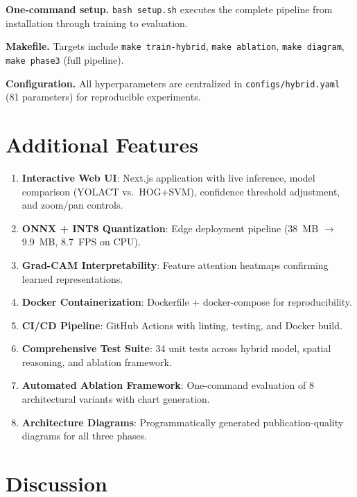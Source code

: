 \documentclass[conference]{IEEEtran}
\begin{document}
\textbf{One-command setup.} \texttt{bash setup.sh} executes the complete pipeline from installation through training to evaluation.

\textbf{Makefile.} Targets include \texttt{make train-hybrid}, \texttt{make ablation}, \texttt{make diagram}, \texttt{make phase3} (full pipeline).

\textbf{Configuration.} All hyperparameters are centralized in \texttt{configs/hybrid.yaml} (81 parameters) for reproducible experiments.

\section{Additional Features}
\label{sec:extra}

\begin{enumerate}
    \item \textbf{Interactive Web UI}: Next.js application with live inference, model comparison (YOLACT vs.\ HOG+SVM), confidence threshold adjustment, and zoom/pan controls.
    \item \textbf{ONNX + INT8 Quantization}: Edge deployment pipeline (38~MB $\rightarrow$ 9.9~MB, 8.7~FPS on CPU).
    \item \textbf{Grad-CAM Interpretability}: Feature attention heatmaps confirming learned representations.
    \item \textbf{Docker Containerization}: Dockerfile + docker-compose for reproducibility.
    \item \textbf{CI/CD Pipeline}: GitHub Actions with linting, testing, and Docker build.
    \item \textbf{Comprehensive Test Suite}: 34 unit tests across hybrid model, spatial reasoning, and ablation framework.
    \item \textbf{Automated Ablation Framework}: One-command evaluation of 8 architectural variants with chart generation.
    \item \textbf{Architecture Diagrams}: Programmatically generated publication-quality diagrams for all three phases.
\end{enumerate}

\section{Discussion}
\label{sec:discussion}
\end{document}
